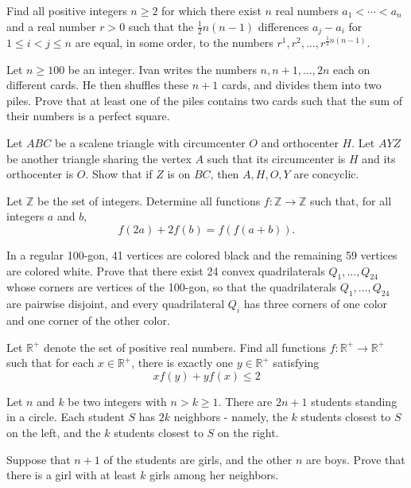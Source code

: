\documentclass[11pt]{scrartcl}
\begin{document}
\begin{problem}[596902679696332]
Find all positive integers $n \geqslant 2$ for which there exist $n$ real numbers $a_1<\cdots< a_n$ and a real number $r>0$ such that the $\tfrac{1}{2}n(n-1)$ differences $a_j-a_i$ for $1 \leqslant i<j \leqslant n$ are equal, in some order, to the numbers $r^1,r^2,\ldots,r^{\frac{1}{2}n(n-1)}$.
\end{problem}
\begin{problem}[258585206260584]
Let $n \geqslant 100$ be an integer. Ivan writes the numbers $n, n+1, \ldots, 2 n$ each on different cards. He then shuffles these $n+1$ cards, and divides them into two piles. Prove that at least one of the piles contains two cards such that the sum of their numbers is a perfect square.
\end{problem}
\begin{problem}[4948608980214807448]
	Let $ABC$ be a scalene triangle with circumcenter $O$ and orthocenter $H$. Let $AYZ$ be another triangle sharing the vertex $A$ such that its circumcenter is $H$ and its orthocenter is $O$. Show that if $Z$ is on $BC$, then $A,H,O,Y$ are concyclic.
\end{problem}
\begin{problem}[684265043263216]
Let $\mathbb{Z}$ be the set of integers. Determine all functions $f: \mathbb{Z} \rightarrow \mathbb{Z}$ such that, for all integers $a$ and $b$,$$f(2a)+2f(b)=f(f(a+b)).$$
\end{problem}
\begin{problem}[2749225075653830789]
	In a regular 100-gon, 41 vertices are colored black and the remaining 59 vertices are colored white. Prove that there exist 24 convex quadrilaterals $Q_{1}, \ldots, Q_{24}$ whose corners are vertices of the 100-gon, so that
the quadrilaterals $Q_{1}, \ldots, Q_{24}$ are pairwise disjoint, and
every quadrilateral $Q_{i}$ has three corners of one color and one corner of the other color.
\end{problem}
\begin{problem}[6558910862034852540]
Let $\mathbb{R}^+$ denote the set of positive real numbers. Find all functions $f: \mathbb{R}^+ \to \mathbb{R}^+$ such that for each $x \in \mathbb{R}^+$, there is exactly one $y \in \mathbb{R}^+$ satisfying$$xf(y)+yf(x) \leq 2$$
\end{problem}
\begin{problem}[3866807698726339637]
Let $n$ and $k$ be two integers with $n>k\geqslant 1$. There are $2n+1$ students standing in a circle. Each student $S$ has $2k$ neighbors - namely, the $k$ students closest to $S$ on the left, and the $k$ students closest to $S$ on the right.

Suppose that $n+1$ of the students are girls, and the other $n$ are boys. Prove that there is a girl with at least $k$ girls among her neighbors.
\end{problem}
\end{document}
